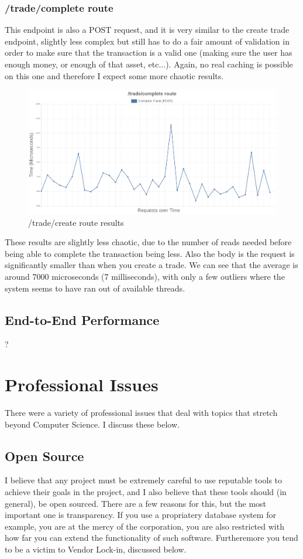 \documentclass[titlepage]{article}
\begin{document}
\subsubsection{/trade/complete route}
This endpoint is also a POST request, and it is very similar to the create trade endpoint, slightly less complex but still has to do a fair amount of validation in order to make sure that the transaction is a valid one (making sure the user has enough money, or enough of that asset, etc...). Again, no real caching is possible on this one and therefore I expect some more chaotic results.

\begin{figure}[h!]
\includegraphics[width=\textwidth]{../results/complete-trade.png}
  \caption{/trade/create route results}
\end{figure}

These results are slightly less chaotic, due to the number of reads needed before being able to complete the transaction being less. Also the body is the request is significantly smaller than when you create a trade. We can see that the average is around 7000 microseconds (7 milliseconds), with only a few outliers where the system seems to have ran out of available threads. 

\subsection{End-to-End Performance}
?

\pagebreak
\section{Professional Issues}
There were a variety of professional issues that deal with topics that stretch beyond Computer Science. I discuss these below.

\subsection{Open Source}
I believe that any project must be extremely careful to use reputable tools to achieve their goals in the project, and I also believe that these tools should (in general), be open sourced. There are a few reasons for this, but the most important one is transparency. If you use a propriatery database system for example, you are at the mercy of the corporation, you are also restricted with how far you can extend the functionality of such software. Furtheremore you tend to be a victim to Vendor Lock-in, discussed below. \\ 
\end{document}

